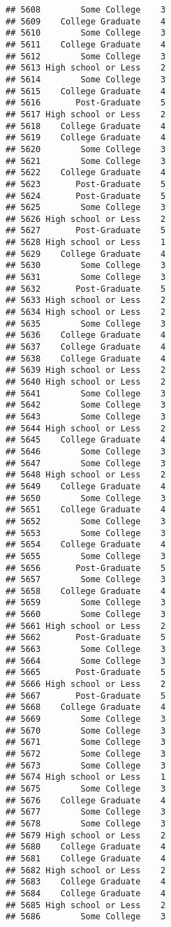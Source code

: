 \documentclass[
]{article}
\begin{document}
\begin{verbatim}
## 5608        Some College    3
## 5609    College Graduate    4
## 5610        Some College    3
## 5611    College Graduate    4
## 5612        Some College    3
## 5613 High school or Less    2
## 5614        Some College    3
## 5615    College Graduate    4
## 5616       Post-Graduate    5
## 5617 High school or Less    2
## 5618    College Graduate    4
## 5619    College Graduate    4
## 5620        Some College    3
## 5621        Some College    3
## 5622    College Graduate    4
## 5623       Post-Graduate    5
## 5624       Post-Graduate    5
## 5625        Some College    3
## 5626 High school or Less    2
## 5627       Post-Graduate    5
## 5628 High school or Less    1
## 5629    College Graduate    4
## 5630        Some College    3
## 5631        Some College    3
## 5632       Post-Graduate    5
## 5633 High school or Less    2
## 5634 High school or Less    2
## 5635        Some College    3
## 5636    College Graduate    4
## 5637    College Graduate    4
## 5638    College Graduate    4
## 5639 High school or Less    2
## 5640 High school or Less    2
## 5641        Some College    3
## 5642        Some College    3
## 5643        Some College    3
## 5644 High school or Less    2
## 5645    College Graduate    4
## 5646        Some College    3
## 5647        Some College    3
## 5648 High school or Less    2
## 5649    College Graduate    4
## 5650        Some College    3
## 5651    College Graduate    4
## 5652        Some College    3
## 5653        Some College    3
## 5654    College Graduate    4
## 5655        Some College    3
## 5656       Post-Graduate    5
## 5657        Some College    3
## 5658    College Graduate    4
## 5659        Some College    3
## 5660        Some College    3
## 5661 High school or Less    2
## 5662       Post-Graduate    5
## 5663        Some College    3
## 5664        Some College    3
## 5665       Post-Graduate    5
## 5666 High school or Less    2
## 5667       Post-Graduate    5
## 5668    College Graduate    4
## 5669        Some College    3
## 5670        Some College    3
## 5671        Some College    3
## 5672        Some College    3
## 5673        Some College    3
## 5674 High school or Less    1
## 5675        Some College    3
## 5676    College Graduate    4
## 5677        Some College    3
## 5678        Some College    3
## 5679 High school or Less    2
## 5680    College Graduate    4
## 5681    College Graduate    4
## 5682 High school or Less    2
## 5683    College Graduate    4
## 5684    College Graduate    4
## 5685 High school or Less    2
## 5686        Some College    3

\end{verbatim}
\end{document}

